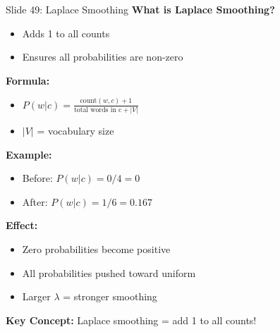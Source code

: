 \documentclass[8pt]{beamer}
\begin{document}
	\begin{frame}{Slide 49: Laplace Smoothing}
		\fontsize{6.5}{7.5}\selectfont
		\textbf{What is Laplace Smoothing?}
		\begin{itemize}
			\item Adds 1 to all counts
			\item Ensures all probabilities are non-zero
		\end{itemize}
		
		\vspace{0.1cm}
		\textbf{Formula:}
		\begin{itemize}
			\item $P(w|c) = \frac{\text{count}(w,c) + 1}{\text{total words in c} + |V|}$
			\item $|V|$ = vocabulary size
		\end{itemize}
		
		\vspace{0.1cm}
		\textbf{Example:}
		\begin{itemize}
			\item Before: $P(w|c) = 0/4 = 0$
			\item After: $P(w|c) = 1/6 = 0.167$
		\end{itemize}
		
		\vspace{0.1cm}
		\textbf{Effect:}
		\begin{itemize}
			\item Zero probabilities become positive
			\item All probabilities pushed toward uniform
			\item Larger $\lambda$ = stronger smoothing
		\end{itemize}
		
		\textcolor{myblue}{\textbf{Key Concept:}} Laplace smoothing = add 1 to all counts!
	\end{frame}
	
\end{document}
